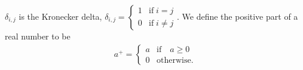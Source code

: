 $\delta_{i,j}$ is the Kronecker delta, $\delta_{i, j} = \begin{cases} 1 & \textrm{if} \; i = j \\ 0 & \textrm{if} \; i \ne j \end{cases}$.
We define the positive part of a real number to be
\begin{align*}
a^+ = \begin{cases} a & \textrm{if} \quad a \ge 0 \\ 0 & \textrm{otherwise}. \end{cases}\\
\end{align*}

